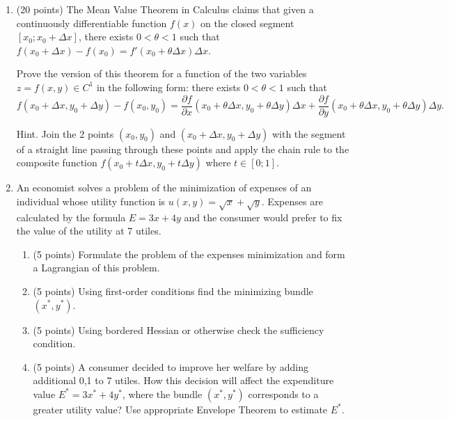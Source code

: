 \documentclass[12pt]{article} %
\theoremstyle{definition} %
\def \putyourname{\fbox{
    \begin{minipage}{42em}
      Name, group no:\vspace*{3ex}\par
      \noindent\dotfill\vspace{2mm}
    \end{minipage}
  }
}
\begin{document}
\newpage
{}
\putyourname
\begin{enumerate}[resume]

  \item (20 points) The Mean Value Theorem in Calculus claims that given a continuously differentiable function $f(x)$  
  on the closed segment $[x_0; x_0 + \Delta x]$, there exists $0 < \theta < 1$ such that $f(x_0 + \Delta x) - f(x_0) = 
  f'(x_0 + \theta \Delta x) \Delta x$. 

  Prove the version of this theorem for a function of the two variables $z = f(x,y) \in C^1$ in the following form: 
  there exists $0 < \theta < 1$ such that 
  \[
    f(x_0 + \Delta x, y_0 + \Delta y) - f(x_0, y_0) = \frac{\partial f}{\partial x}(x_0 + \theta \Delta x, y_0 + \theta \Delta y)\Delta x + \frac{\partial f}{\partial y}(x_0 + \theta \Delta x, y_0 + \theta \Delta y)\Delta y.  
  \]
  
  
  Hint. Join the 2 points $(x_0, y_0)$ and $(x_0 + \Delta x, y_0 + \Delta y)$ with the segment of a straight line passing through these points 
  and apply the chain rule to the composite function $f(x_0 + t \Delta x, y_0 + t \Delta y)$ where $t\in [0;1]$.
  
  
  \newpage
  \putyourname
    \item An economist solves a problem of the minimization of expenses of an individual whose utility function is $u(x, y) = \sqrt{x} + \sqrt{y}$. 
  Expenses are calculated by the formula $E=3x + 4y$ and the consumer would prefer to fix the value of the utility at 7 utiles.
  \begin{enumerate}
  \item (5 points) Formulate the problem of the expenses minimization and form a Lagrangian of this problem.
  \item (5 points) Using first-order conditions find the minimizing bundle $(x^*, y^*)$.
  \item (5 points) Using bordered Hessian or otherwise check the sufficiency condition.
  \item (5 points) A consumer decided to improve her welfare by adding additional 0,1 to 7 utiles. 
  How this decision will affect the expenditure value $E^* = 3x^* + 4y^*$, 
  where the bundle $(x^*, y^*)$ corresponds to a greater utility value? 
  Use appropriate Envelope Theorem to estimate $E^*$.
\end{enumerate}

\end{enumerate}
\end{document}
